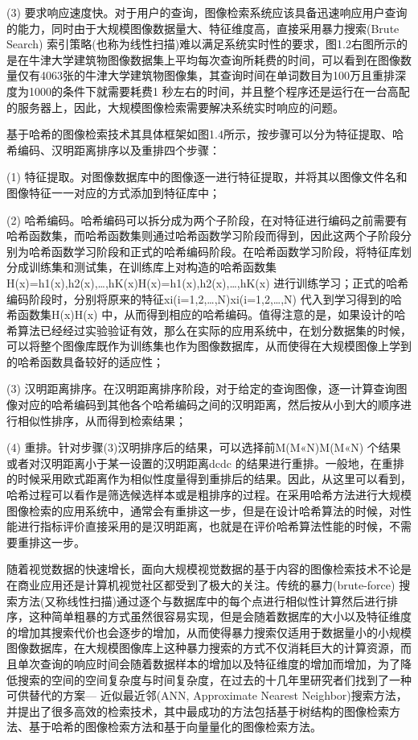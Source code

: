 \documentclass[color=cyan,mathpazo,titlestyle=hang]{elegantbook}
\begin{document}
(3) 要求响应速度快。对于用户的查询，图像检索系统应该具备迅速响应用户查询的能力，同时由于大规模图像数据量大、特征维度高，直接采用暴力搜索(Brute Search) 索引策略(也称为线性扫描)难以满足系统实时性的要求，图1.2右图所示的是在牛津大学建筑物图像数据集上平均每次查询所耗费的时间，可以看到在图像数量仅有4063张的牛津大学建筑物图像集，其查询时间在单词数目为100万且重排深度为1000的条件下就需要耗费1 秒左右的时间，并且整个程序还是运行在一台高配的服务器上，因此，大规模图像检索需要解决系统实时响应的问题。

基于哈希的图像检索技术其具体框架如图1.4所示，按步骤可以分为特征提取、哈希编码、汉明距离排序以及重排四个步骤：

(1) 特征提取。对图像数据库中的图像逐一进行特征提取，并将其以图像文件名和图像特征一一对应的方式添加到特征库中；

(2) 哈希编码。哈希编码可以拆分成为两个子阶段，在对特征进行编码之前需要有哈希函数集，而哈希函数集则通过哈希函数学习阶段而得到，因此这两个子阶段分别为哈希函数学习阶段和正式的哈希编码阶段。在哈希函数学习阶段，将特征库划分成训练集和测试集，在训练库上对构造的哈希函数集H(x)=h1(x),h2(x),…,hK(x)H(x)=h1(x),h2(x),…,hK(x) 进行训练学习；正式的哈希编码阶段时，分别将原来的特征xi(i=1,2,…,N)xi(i=1,2,…,N) 代入到学习得到的哈希函数集H(x)H(x) 中，从而得到相应的哈希编码。值得注意的是，如果设计的哈希算法已经经过实验验证有效，那么在实际的应用系统中，在划分数据集的时候，可以将整个图像库既作为训练集也作为图像数据库，从而使得在大规模图像上学到的哈希函数具备较好的适应性；

(3) 汉明距离排序。在汉明距离排序阶段，对于给定的查询图像，逐一计算查询图像对应的哈希编码到其他各个哈希编码之间的汉明距离，然后按从小到大的顺序进行相似性排序，从而得到检索结果；

(4) 重排。针对步骤(3)汉明排序后的结果，可以选择前M(M«N)M(M«N) 个结果或者对汉明距离小于某一设置的汉明距离dcdc 的结果进行重排。一般地，在重排的时候采用欧式距离作为相似性度量得到重排后的结果。因此，从这里可以看到，哈希过程可以看作是筛选候选样本或是粗排序的过程。在采用哈希方法进行大规模图像检索的应用系统中，通常会有重排这一步，但是在设计哈希算法的时候，对性能进行指标评价直接采用的是汉明距离，也就是在评价哈希算法性能的时候，不需要重排这一步。

随着视觉数据的快速增长，面向大规模视觉数据的基于内容的图像检索技术不论是在商业应用还是计算机视觉社区都受到了极大的关注。传统的暴力(brute-force) 搜索方法(又称线性扫描)通过逐个与数据库中的每个点进行相似性计算然后进行排序，这种简单粗暴的方式虽然很容易实现，但是会随着数据库的大小以及特征维度的增加其搜索代价也会逐步的增加，从而使得暴力搜索仅适用于数据量小的小规模图像数据库，在大规模图像库上这种暴力搜索的方式不仅消耗巨大的计算资源，而且单次查询的响应时间会随着数据样本的增加以及特征维度的增加而增加，为了降低搜索的空间的空间复杂度与时间复杂度，在过去的十几年里研究者们找到了一种可供替代的方案— 近似最近邻(ANN, Approximate Nearest Neighbor)搜索方法，并提出了很多高效的检索技术，其中最成功的方法包括基于树结构的图像检索方法、基于哈希的图像检索方法和基于向量量化的图像检索方法。
\end{document}

